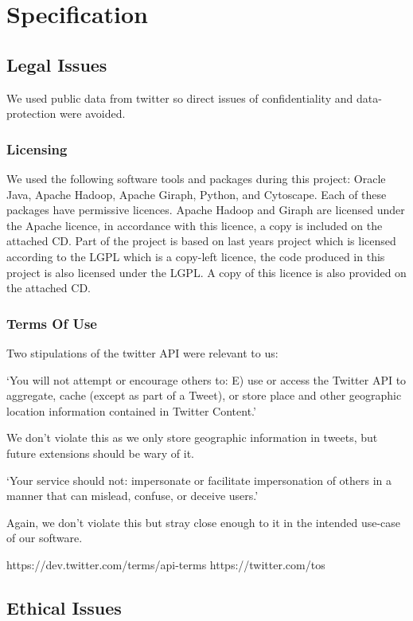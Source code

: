 \chapter{Specification}

\section{Legal Issues}

We used public data from twitter so direct issues of confidentiality and data-protection were avoided.

\subsection{Licensing}

We used the following software tools and packages during this project: Oracle Java, Apache Hadoop, Apache Giraph, Python, and Cytoscape. Each of these packages have permissive licences. Apache Hadoop and Giraph are licensed under the Apache licence, in accordance with this licence, a copy is included on the attached CD. Part of the project is based on last years project which is licensed according to the LGPL which is a copy-left licence, the code produced in this project is also licensed under the LGPL. A copy of this licence is also provided on the attached CD.

\subsection{Terms Of Use}

Two stipulations of the twitter API were relevant to us:

`You will not attempt or encourage others to: E) use or access the Twitter API to aggregate, 
cache (except as part of a Tweet), or store place and other geographic location information 
contained in Twitter Content.'

We don't violate this as we only store geographic information in tweets, but future extensions should be wary of it.

`Your service should not: impersonate or facilitate impersonation of others in a manner that can mislead, confuse, or deceive users.'

Again, we don't violate this but stray close enough to it in the intended use-case of our software.

https://dev.twitter.com/terms/api-terms
https://twitter.com/tos

\section{Ethical Issues}

